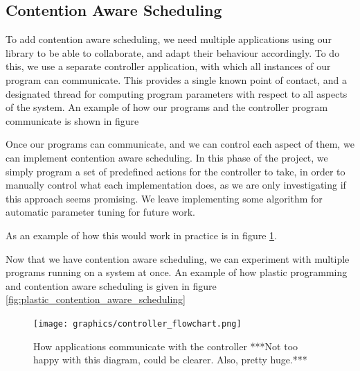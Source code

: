 \subsection{Contention Aware Scheduling}

To add contention aware scheduling, we need multiple applications using our library to be able to collaborate, and adapt their behaviour accordingly. To do this, we use a separate controller application, with which all instances of our program can communicate. This provides a single known point of contact, and a designated thread for computing program parameters with respect to all aspects of the system. An example of how our programs and the controller program communicate is shown in figure 

Once our programs can communicate, and we can control each aspect of them, we can implement contention aware scheduling. In this phase of the project, we simply program a set of predefined actions for the controller to take, in order to manually control what each implementation does, as we are only investigating if this approach seems promising. We leave implementing some algorithm for automatic parameter tuning for future work.

As an example of how this would work in practice is in figure \ref{fig:controller_flowchart}.

Now that we have contention aware scheduling, we can experiment with multiple programs running on a system at once. An example of how plastic programming and contention aware scheduling is given in figure \ref{fig:plastic_contention_aware_scheduling}




\begin{figure}
	\texttt{[image: graphics/controller\_flowchart.png]}
	\caption{How applications communicate with the controller ***Not too happy with this diagram, could be clearer. Also, pretty huge.***}
	\label{fig:controller_flowchart}
\end{figure}

